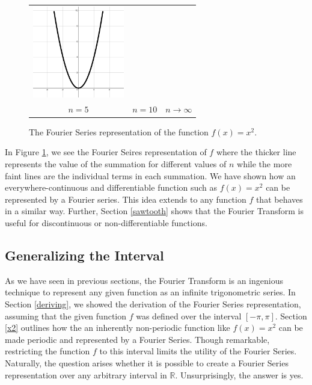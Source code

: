 \documentclass[11pt]{amsart}
\theoremstyle{plain}
\theoremstyle{definition}
\newcommand{\R}{\mathbb R}
\begin{document}
\begin{figure}[ht!]
\begin{tabular}{ccc}
  \includegraphics[width=40mm]{Images/simple_full.png} \\
  $n=5$ & $n=10$ & $n\to\infty$\\[6pt]
\end{tabular}
\caption{\centering The Fourier Series representation of the function $f(x)=x^2$.}
\label{fig:simple}
\end{figure}

In Figure \ref{fig:simple}, we see the Fourier Seires representation of $f$ where the thicker line represents the value of the summation for different values of $n$ while the more faint lines are the individual terms in each summation. We have shown how an everywhere-continuous and differentiable function such as $f(x)=x^2$ can be represented by a Fourier series. This idea extends to any function $f$ that behaves in a similar way. Further, Section \ref{sawtooth} shows that the Fourier Transform is useful for discontinuous or non-differentiable functions.

\subsection{Generalizing the Interval}\label{bounds}
    As we have seen in previous sections, the Fourier Transform is an ingenious technique to represent any given function as an infinite trigonometric series. In Section \ref{deriving}, we showed the derivation of the Fourier Series representation, assuming that the given function $f$ was defined over the interval $[-\pi,\pi]$. Section \ref{x2} outlines how the an inherently non-periodic function like $f(x) = x^2$ can be made periodic and represented by a Fourier Series. Though remarkable, restricting the function $f$ to this interval limits the utility of the Fourier Series. Naturally, the question arises whether it is possible to create a Fourier Series representation over any arbitrary interval in $\R$. Unsurprisingly, the answer is yes.  
\end{document}

